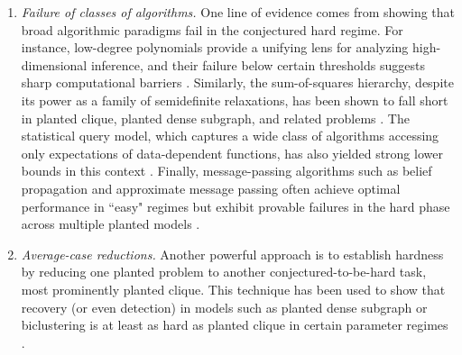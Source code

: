 \documentclass[12pt]{article}
\begin{document}
\begin{enumerate}[leftmargin=*]
    \item \emph{Failure of classes of algorithms.} One line of evidence comes from showing that broad algorithmic paradigms fail in the conjectured hard regime. For instance, low-degree polynomials provide a unifying lens for analyzing high-dimensional inference, and their failure below certain thresholds suggests sharp computational barriers \cite{hopkins2017bayesian,Hopkins18,Kunisky19,Cherapanamjeri20,gamarnik2020lowdegree}. Similarly, the sum-of-squares hierarchy, despite its power as a family of semidefinite relaxations, has been shown to fall short in planted clique, planted dense subgraph, and related problems \cite{barak2016nearly,deshpande2015improved,meka2015sum,TengyuWig15,kothari2017sum,hopkins2016integrality,raghavendra2019highdimensional,hopkins2017power,mohanty2019lifting}. The statistical query model, which captures a wide class of algorithms accessing only expectations of data-dependent functions, has also yielded strong lower bounds in this context \cite{Feldman17,feldman2018complexity,Diakonikolas17,DiakonikolasKong19,pmlr-v134-brennan21a}. Finally, message-passing algorithms such as belief propagation and approximate message passing often achieve optimal performance in ``easy" regimes but exhibit provable failures in the hard phase across multiple planted models \cite{Lenka16,Lesieur_2015,Lesieur_2016,Krzakala10318,Ricci_Tersenghi_2019,bandeira2018notes}.
    \item \emph{Average-case reductions.} Another powerful approach is to establish hardness by reducing one planted problem to another conjectured-to-be-hard task, most prominently planted clique. This technique has been used to show that recovery (or even detection) in models such as planted dense subgraph or biclustering is at least as hard as planted clique in certain parameter regimes \cite{berthet2013complexity,ma2015computational,cai2015computational,chen2016statistical,hajek2015computational,wang2016average,wang2016statistical,gao2017sparse,brennan18a,brennan19,wu2018statistical,brennan20a}.
\end{enumerate}
\end{document}
